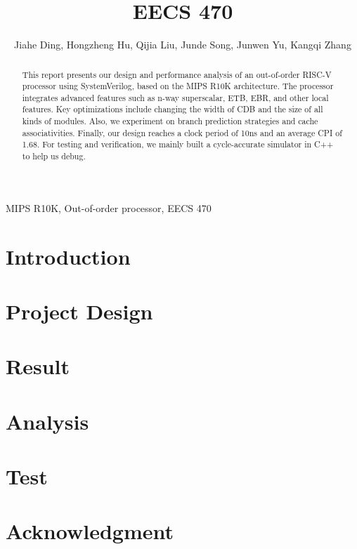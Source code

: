 \documentclass[conference]{IEEEtran}
\begin{document}
\title{EECS 470}

\author{Jiahe Ding, Hongzheng Hu, Qijia Liu, Junde Song, Junwen Yu, Kangqi Zhang
}

\maketitle

\begin{abstract}
This report presents our design and performance analysis of an out-of-order RISC-V processor using SystemVerilog, based on the MIPS R10K architecture. The processor integrates advanced features such as n-way superscalar, ETB, EBR, and other local features. Key optimizations include changing the width of CDB and the size of all kinds of modules. Also, we experiment on branch prediction strategies and cache associativities. Finally, our design reaches a clock period of 10ns and an average CPI of 1.68. For testing and verification, we mainly built a cycle-accurate simulator in C++ to help us debug. 
\end{abstract}

\begin{IEEEkeywords}
MIPS R10K, Out-of-order processor, EECS 470
\end{IEEEkeywords}

\section{Introduction}


\section{Project Design}


\section{Result}


\section{Analysis}


\section{Test}




\section*{Acknowledgment}
\end{document}
